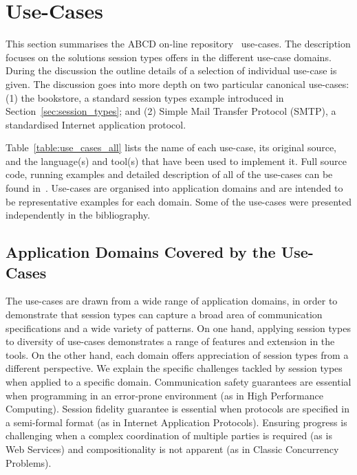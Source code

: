 
\section{Use-Cases}
\label{sec:usecases}

This section summarises the ABCD on-line
repository~\cite{usecase_repository} use-cases.
The description focuses on the
solutions session types offers in the different 
use-case domains. During the discussion
the outline details of a selection of individual
use-case is given. The discussion goes
into more depth on two particular canonical
use-cases:
(1) the bookstore, a standard session types example introduced
in Section~\ref{sec:session_types};
and
(2) Simple Mail Transfer Protocol (SMTP),
a standardised Internet application protocol.

Table~\ref{table:use_cases_all} lists the name of each use-case,
its original source, and the language(s) and tool(s) that have been
used to implement it. Full source code, running examples and detailed
description of all of the use-cases can be found in~\cite{usecase_repository}. 
Use-cases are organised into application domains and are intended
to be representative examples for each domain. Some of the use-cases
were presented independently in the bibliography.

\subsection{Application Domains Covered by the Use-Cases}

The use-cases are drawn from a wide range of
application domains, in order to demonstrate that
session types can capture a broad area of communication
specifications and a wide variety of patterns.
On  one hand, applying session types to diversity of use-cases
demonstrates a range of features and extension in the tools. 
%
On the other  hand, each domain offers appreciation
of session types from a different perspective.
We explain the specific challenges tackled by session types
when applied to a specific domain.
Communication safety guarantees are essential when
programming in an error-prone environment
(as in High Performance Computing).
Session fidelity guarantee is essential when protocols
are specified in a semi-formal format
(as in Internet Application Protocols).
Ensuring progress is challenging when a complex
coordination of multiple parties is required (as is Web Services)
and compositionality is not apparent
(as in Classic Concurrency Problems).

